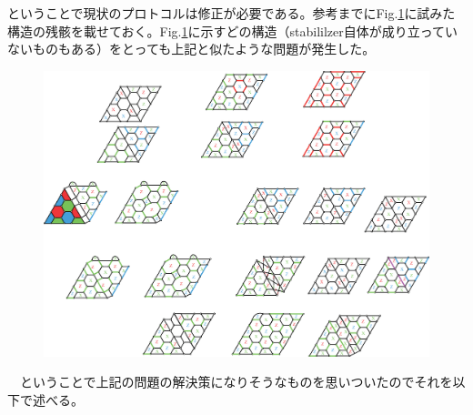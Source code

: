 \documentclass[a4paper,10pt]{ltjsarticle}
\begin{document}
{    ということで現状のプロトコルは修正が必要である。参考までにFig.\ref{figure5}に試みた構造の残骸を載せておく。Fig.\ref{figure5}に示すどの構造（stabililzer自体が成り立っていないものもある）をとっても上記と似たような問題が発生した。

    \begin{figure}[h]
        \centering
        \includegraphics[scale=0.5]{figure/figure5.eps}
        \caption{ }
        \label{figure5}
    \end{figure}
}
\clearpage
　ということで上記の問題の解決策になりそうなものを思いついたのでそれを以下で述べる。
\end{document}
